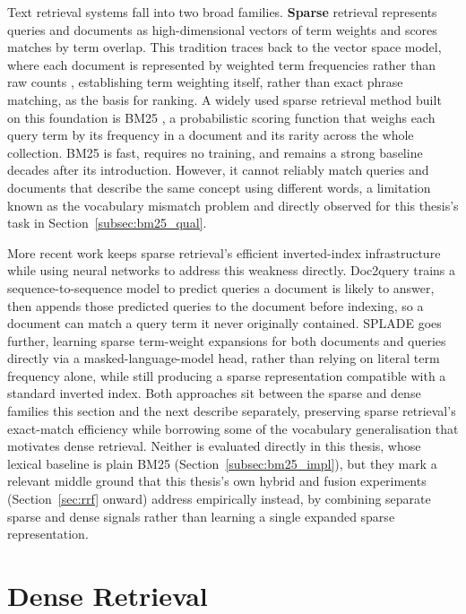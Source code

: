 \documentclass[a4paper,oneside,bibliography=totoc]{scrbook}
\begin{document}
Text retrieval systems fall into two broad families. \textbf{Sparse} retrieval represents queries and documents as high-dimensional vectors of term weights and scores matches by term overlap. This tradition traces back to the vector space model, where each document is represented by weighted term frequencies rather than raw counts \citep{salton1988termweighting}, establishing term weighting itself, rather than exact phrase matching, as the basis for ranking. A widely used sparse retrieval method built on this foundation is BM25 \citep{robertson2009probabilistic}, a probabilistic scoring function that weighs each query term by its frequency in a document and its rarity across the whole collection. BM25 is fast, requires no training, and remains a strong baseline decades after its introduction. However, it cannot reliably match queries and documents that describe the same concept using different words, a limitation known as the vocabulary mismatch problem and directly observed for this thesis's task in Section~\ref{subsec:bm25_qual}.

More recent work keeps sparse retrieval's efficient inverted-index infrastructure while using neural networks to address this weakness directly. Doc2query \citep{nogueira2019doc2query} trains a sequence-to-sequence model to predict queries a document is likely to answer, then appends those predicted queries to the document before indexing, so a document can match a query term it never originally contained. SPLADE \citep{formal2021splade} goes further, learning sparse term-weight expansions for both documents and queries directly via a masked-language-model head, rather than relying on literal term frequency alone, while still producing a sparse representation compatible with a standard inverted index. Both approaches sit between the sparse and dense families this section and the next describe separately, preserving sparse retrieval's exact-match efficiency while borrowing some of the vocabulary generalisation that motivates dense retrieval. Neither is evaluated directly in this thesis, whose lexical baseline is plain BM25 (Section~\ref{subsec:bm25_impl}), but they mark a relevant middle ground that this thesis's own hybrid and fusion experiments (Section~\ref{sec:rrf} onward) address empirically instead, by combining separate sparse and dense signals rather than learning a single expanded sparse representation.

\section{Dense Retrieval}
\label{sec:lit_dense}
\end{document}
